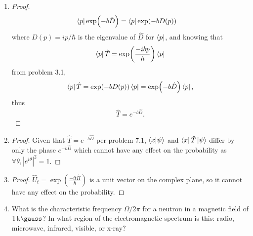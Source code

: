\begin{enumerate}
\item[7.1] 
  \begin{proof}
    \begin{align*}
      \bra{p} \exp(-b\hat{D}) &= \bra{p} \exp(-bD(p))
    \end{align*}
    where $D(p) = ip/\hbar$ is the eigenvalue of $\hat{D}$ for $\bra{p}$, and knowing that
    \begin{equation}
      \bra{p} \hat{T} = \exp(\frac{-ibp}{\hbar}) \bra{p}
    \end{equation}
    from problem 3.1,
    \begin{align*}
      \bra{p} \hat{T} = \exp(-bD(p)) \bra{p} = \exp(-b\hat{D}) \bra{p},
    \end{align*}
    thus
    \begin{align*}
      \hat{T} = e^{-b\hat{D}}.
    \end{align*}
  \end{proof}
\item[7.2] 
  \begin{proof}
    Given that $\hat{T} = e^{-b\hat{D}}$ per problem 7.1, $\braket{x}{\psi}$ and $\bra{x} \hat{T} \ket{\psi}$ differ by only the phase $e^{-b\hat{D}}$ which cannot have any effect on the probability as $\forall \theta, |e^{i\theta}|^2 = 1$.
  \end{proof}
\item[7.3] 
  \begin{proof}
    $\hat{U}_t = \exp(\frac{-it\hat{H}}{\hbar})$ is a unit vector on the complex plane, so it cannot have any effect on the probability.
  \end{proof}
\item[7.4] What is the characteristic frequency $\Omega/2\pi$ for a neutron in a magnetic field of $\SI{1}{\kilo\gauss}$? In what region of the electromagnetic spectrum is this: radio, microwave, infrared, visible, or x-ray?


\end{enumerate}
